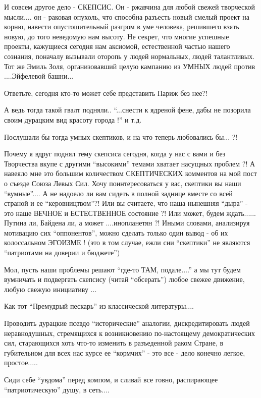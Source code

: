И совсем другое дело - СКЕПСИС. Он - ржавчина для любой свежей творческой
мысли.... он - раковая опухоль, что способна разъесть новый смелый проект на
корню, навести опустошительный разгром в уме человека, решившего взять новую,
до того неведомую нам высоту. Не секрет, что многие успешные проекты, кажущиеся
сегодня нам аксиомой, естественной частью нашего сознания, поначалу вызывали
оторопь у людей нормальных, людей талантливых. Тот же Эмиль Золя,
организовавший целую кампанию из УМНЫХ людей против ....Эйфелевой башни... 

Ответьте, сегодня кто-то может себе представить Париж без нее?! 

А ведь тогда такой гвалт подняли.. \enquote{...снести к ядреной фене, дабы не позорила
своим дурацким вид красоту города !}
и т.д. 

Послушали бы тогда умных скептиков, и на что теперь любовались бы... ?!

Почему я вдруг поднял тему скепсиса сегодня, когда у нас с вами и без
Творчества вкупе с другими \enquote{высокими} темами хватает насущных проблем ?! А
навеяло мне это большим количеством СКЕПТИЧЕСКИХ комментов на мой пост о съезде
Союза Левых Сил. Хочу поинтересоваться у вас, скептики вы наши \enquote{вумные}.... А
не надоело ли вам сидеть в полной заднице вместе со всей страной и ее
\enquote{керовництвом}?! Или вы считаете, что наша нынешняя \enquote{дыра} - это наше ВЕЧНОЕ и
ЕСТЕСТВЕННОЕ состояние ?! Или может, будем ждать...... Путина ли, Байдена ли, а
может  ....инопланетян ?! Иными словами, анализируя мотивацию сих \enquote{оппонентов},
можно сделать только один вывод - об их колоссальном ЭГОИЗМЕ !   (это в том
случае, ежли сии \enquote{скептики} не являются \enquote{патриотами на доверии и бюджете})

Мол, пусть наши проблемы решают \enquote{где-то ТАМ, подале....} а мы тут будем
вумничать и подвергать скепсису (читай \enquote{обсерать}) любое свежее движение, любую
свежую инициативу ...

Как тот \enquote{Премудрый пескарь} из классической литературы....

Проводить дурацкие псевдо \enquote{исторические} аналогии, дискредитировать людей
неравнодушных, стремящихся к возникновению по-настоящему демократических сил,
старающихся хоть что-то изменить в разъеденной раком Стране, в губительном для
всех нас курсе ее \enquote{кормчих} - это все - дело конечно легкое, простое..... 

Сиди себе \enquote{увдома} перед компом, и сливай все говно, распирающее
\enquote{патриотическую} душу,  в сеть.... 


